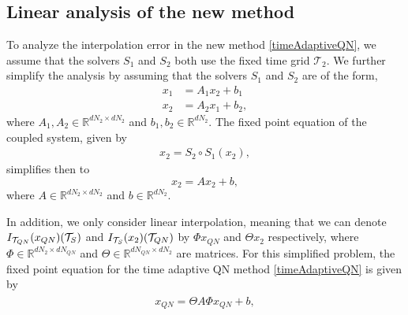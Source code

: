 \subsection{Linear analysis of the new method}\label{analysisQN}

To analyze the interpolation error in the new method \eqref{timeAdaptiveQN}, we assume that the solvers $S_1$ and $S_2$ both use the fixed time grid $\mathcal{T}_2$. 
We further simplify the analysis by assuming that the solvers $S_1$ and $S_2$ are of the form, 
\begin{align*}
	x_1 &= A_1 x_2 + b_1 \\
	x_2 &= A_2 x_1 + b_2,
\end{align*} 
where $A_1, A_2 \in \mathbb{R}^{d N_2 \times d N_2}$ and $b_1, b_2 \in \mathbb{R}^{d N_2}$. The fixed point equation of the coupled system, given by 
\begin{align*}
	x_2 = S_2 \circ S_1(x_2),
\end{align*}
 simplifies then to 
 \begin{equation}\label{simWRTA}
	x_2 = A x_2 + b,
\end{equation} 
where $A \in \mathbb{R}^{d N_2 \times d N_2}$ and $b \in \mathbb{R}^{d N_2}$. 

In addition, we only consider linear interpolation, meaning that we can denote $I_{\mathcal{T}_{QN}}(x_{QN})({\cal T}_S)$ and $I_{\mathcal{T}_{S}}(x_{2})({\cal T}_{QN})$ by $\Phi x_{QN}$ and $\Theta x_{2}$ respectively, where $\Phi \in \mathbb{R}^{d N_2\times d N_{QN}}$ and $\Theta \in \mathbb{R}^{d N_{QN}\times d N_{2}}$ are matrices. For this simplified problem, the fixed point equation for the time adaptive QN method \eqref{timeAdaptiveQN} is given by \begin{align}\label{simQNWRTA}
	\begin{split}
		x_{QN} =\Theta A \Phi x_{QN} + b, \\
	\end{split}
\end{align} 

